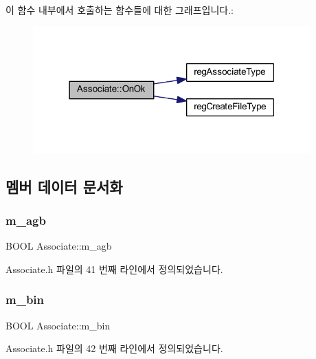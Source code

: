 이 함수 내부에서 호출하는 함수들에 대한 그래프입니다.\+:
\nopagebreak
\begin{figure}[H]
\begin{center}
\leavevmode
\includegraphics[width=303pt]{class_associate_abb81ded9b91053ed12804ee8674ae860_cgraph}
\end{center}
\end{figure}


\subsection{멤버 데이터 문서화}
\mbox{\label{class_associate_ab6d59a4b47c5529c1e5f5b8f8b5a6f82}} 
\subsubsection{\texorpdfstring{m\+\_\+agb}{m\_agb}}
{\footnotesize\ttfamily B\+O\+OL Associate\+::m\+\_\+agb}



Associate.\+h 파일의 41 번째 라인에서 정의되었습니다.

\mbox{\label{class_associate_ac132c6bfb6f547702c2e7386650a0a4c}} 
\subsubsection{\texorpdfstring{m\+\_\+bin}{m\_bin}}
{\footnotesize\ttfamily B\+O\+OL Associate\+::m\+\_\+bin}



Associate.\+h 파일의 42 번째 라인에서 정의되었습니다.

\mbox{\label{class_associate_af245524b613121a7a5291deebfb97e0e}} 
